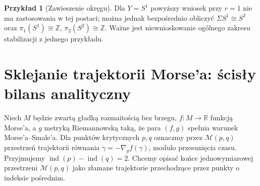 \documentclass[11pt,a4paper,oneside]{report}
\newcommand{\R}{\mathbb{R}}
\newcommand{\Z}{\mathbb{Z}}
\theoremstyle{plain}
\theoremstyle{definition}
\newtheorem{przyklad}[twierdzenie]{Przykład}
\theoremstyle{remark}
\begin{document}
\begin{przyklad}[Zawieszenie okręgu]
Dla $Y=S^1$ powyższy wniosek przy $r=1$ nie ma zastosowania
w tej postaci; można jednak bezpośrednio obliczyć
$\Sigma S^1\cong S^2$ oraz
$\pi_1(S^1)\cong\Z$, $\pi_2(S^2)\cong\Z$.
Ważne jest niewnioskowanie ogólnego zakresu stabilizacji
z jednego przykładu.
\end{przyklad}

\section{Sklejanie trajektorii Morse'a: ścisły bilans analityczny}
Niech $M$ będzie zwartą gładką rozmaitością bez brzegu,
$f:M\to\R$ funkcją Morse'a, a $g$ metryką Riemannowską
taką, że para $(f,g)$ spełnia warunek Morse'a--Smale'a.
Dla punktów krytycznych $p,q$ oznaczmy przez
$\mathcal M(p,q)$ przestrzeń trajektorii równania
$\dot\gamma=-\nabla_g f(\gamma)$, modulo przesunięcia czasu.
Przyjmujemy $\operatorname{ind}(p)-\operatorname{ind}(q)=2$.
Chcemy opisać końce jednowymiarowej przestrzeni
$\mathcal M(p,q)$ jako złamane trajektorie przechodzące
przez punkty o indeksie pośrednim.
\end{document}

